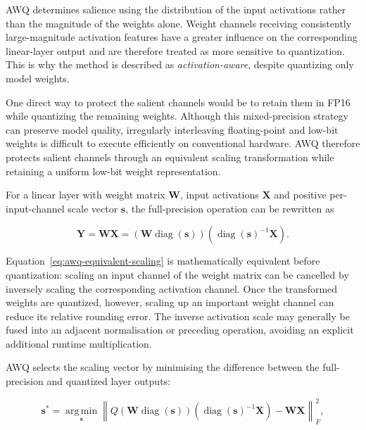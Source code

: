 AWQ determines salience using the distribution of the input
activations rather than the magnitude of the weights alone. Weight
channels receiving consistently large-magnitude activation features
have a greater influence on the corresponding linear-layer output and
are therefore treated as more sensitive to quantization\cite{lin2026awqactivationawareweightquantization}. This is why
the method is described as \emph{activation-aware}, despite quantizing
only model weights.

One direct way to protect the salient channels would be to retain them
in FP16 while quantizing the remaining weights. Although this
mixed-precision strategy can preserve model quality, irregularly
interleaving floating-point and low-bit weights is difficult to execute
efficiently on conventional hardware. AWQ therefore protects salient
channels through an equivalent scaling transformation while retaining a
uniform low-bit weight representation.

For a linear layer with weight matrix \(\mathbf{W}\), input
activations \(\mathbf{X}\) and positive per-input-channel scale vector
\(\mathbf{s}\), the full-precision operation can be rewritten as

\begin{equation}
\mathbf{Y}
=
\mathbf{W}\mathbf{X}
=
\left(
\mathbf{W}\operatorname{diag}(\mathbf{s})
\right)
\left(
\operatorname{diag}(\mathbf{s})^{-1}\mathbf{X}
\right).
\label{eq:awq-equivalent-scaling}
\end{equation}

Equation~\eqref{eq:awq-equivalent-scaling} is mathematically equivalent
before quantization: scaling an input channel of the weight matrix can
be cancelled by inversely scaling the corresponding activation
channel. Once the transformed weights are quantized, however, scaling
up an important weight channel can reduce its relative rounding error.
The inverse activation scale may generally be fused into an adjacent
normalisation or preceding operation, avoiding an explicit additional
runtime multiplication.

AWQ selects the scaling vector by minimising the difference between the
full-precision and quantized layer outputs:

\begin{equation}
\mathbf{s}^{*}
=
\underset{\mathbf{s}}{\operatorname{arg\,min}}
\left\|
Q\left(
\mathbf{W}\operatorname{diag}(\mathbf{s})
\right)
\left(
\operatorname{diag}(\mathbf{s})^{-1}\mathbf{X}
\right)
-
\mathbf{W}\mathbf{X}
\right\|_{F}^{2},
\label{eq:awq-scaling-objective}
\end{equation}

